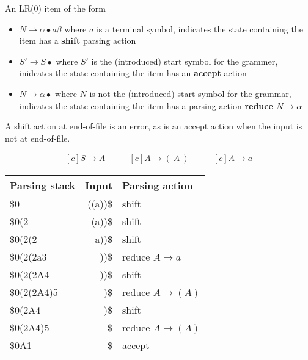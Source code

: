 An LR(0) item of the form
\begin{itemize}
    \item $N \rightarrow \alpha \bullet a \beta$ where $a$ is a terminal symbol, indicates 
    the state containing the item has a \textbf{shift} parsing action
    \item $S' \rightarrow S \bullet$ where $S'$ is the (introduced) start symbol for the 
    grammer, inidcates the state containing the item has an  \textbf{accept} action
    \item $N \rightarrow \alpha \bullet$ where $N$ is not the (introduced) start symbol for 
    the grammar, indicates the state containing the item has a parsing action 
    \textbf{reduce $N \rightarrow \alpha$}
\end{itemize}
A shift action at end-of-file is an error, as is an accept action when the input is not at 
end-of-file.

\begin{equation*}
    \begin{aligned}[c]
        S \rightarrow A
    \end{aligned}
    \qquad 
    \begin{aligned}[c]
        A \rightarrow (\ A\ )
    \end{aligned}
    \qquad 
    \begin{aligned}[c]
        A \rightarrow a
    \end{aligned}
\end{equation*}
\begin{center}
    \begin{tabular}{|lr|l|}
        \hline
        Parsing stack \hspace{0.5cm} & Input & Parsing action \\
        \hline
        \$0 & ((a))\$ & shift \\
        \$0(2 & (a))\$ & shift \\
        \$0(2(2 & a))\$ & shift \\
        \$0(2(2a3 & ))\$ & reduce $A \rightarrow a$ \\
        \$0(2(2A4 & ))\$ & shift \\
        \$0(2(2A4)5 & )\$ & reduce \( A \rightarrow (A)\) \\
        \$0(2A4 & )\$ & shift \\
        \$0(2A4)5 & \$ & reduce \( A \rightarrow (A)\) \\
        \$0A1 & \$ & accept \\
        \hline
    \end{tabular}
\end{center}


